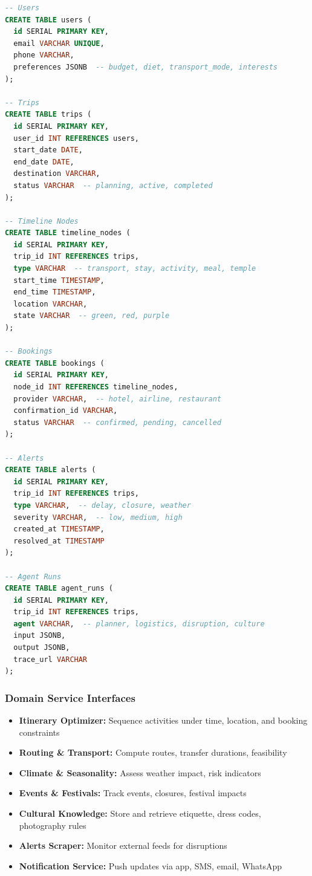 \documentclass[11pt]{article}
\begin{document}
\begin{lstlisting}[language=sql, caption=Core Tables]
-- Users
CREATE TABLE users (
  id SERIAL PRIMARY KEY,
  email VARCHAR UNIQUE,
  phone VARCHAR,
  preferences JSONB  -- budget, diet, transport_mode, interests
);

-- Trips
CREATE TABLE trips (
  id SERIAL PRIMARY KEY,
  user_id INT REFERENCES users,
  start_date DATE,
  end_date DATE,
  destination VARCHAR,
  status VARCHAR  -- planning, active, completed
);

-- Timeline Nodes
CREATE TABLE timeline_nodes (
  id SERIAL PRIMARY KEY,
  trip_id INT REFERENCES trips,
  type VARCHAR  -- transport, stay, activity, meal, temple
  start_time TIMESTAMP,
  end_time TIMESTAMP,
  location VARCHAR,
  state VARCHAR  -- green, red, purple
);

-- Bookings
CREATE TABLE bookings (
  id SERIAL PRIMARY KEY,
  node_id INT REFERENCES timeline_nodes,
  provider VARCHAR,  -- hotel, airline, restaurant
  confirmation_id VARCHAR,
  status VARCHAR  -- confirmed, pending, cancelled
);

-- Alerts
CREATE TABLE alerts (
  id SERIAL PRIMARY KEY,
  trip_id INT REFERENCES trips,
  type VARCHAR,  -- delay, closure, weather
  severity VARCHAR,  -- low, medium, high
  created_at TIMESTAMP,
  resolved_at TIMESTAMP
);

-- Agent Runs
CREATE TABLE agent_runs (
  id SERIAL PRIMARY KEY,
  trip_id INT REFERENCES trips,
  agent VARCHAR,  -- planner, logistics, disruption, culture
  input JSONB,
  output JSONB,
  trace_url VARCHAR
);
\end{lstlisting}

\subsubsection{Domain Service Interfaces}

\begin{itemize}
    \item \textbf{Itinerary Optimizer:} Sequence activities under time, location, and booking constraints
    \item \textbf{Routing \& Transport:} Compute routes, transfer durations, feasibility
    \item \textbf{Climate \& Seasonality:} Assess weather impact, risk indicators
    \item \textbf{Events \& Festivals:} Track events, closures, festival impacts
    \item \textbf{Cultural Knowledge:} Store and retrieve etiquette, dress codes, photography rules
    \item \textbf{Alerts Scraper:} Monitor external feeds for disruptions
    \item \textbf{Notification Service:} Push updates via app, SMS, email, WhatsApp
\end{itemize}
\end{document}
